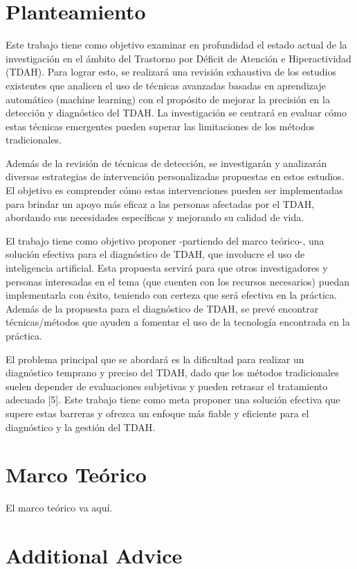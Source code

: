 \documentclass[10pt,journal,compsoc]{IEEEtran}
\begin{document}
\section{Planteamiento}
Este trabajo tiene como objetivo examinar en profundidad el estado actual de la investigación en el ámbito del Trastorno por Déficit de Atención e Hiperactividad (TDAH). Para lograr esto, se realizará una revisión exhaustiva de los estudios existentes que analicen el uso de técnicas avanzadas basadas en aprendizaje automático (machine learning) con el propósito de mejorar la precisión en la detección y diagnóstico del TDAH. La investigación se centrará en evaluar cómo estas técnicas emergentes pueden superar las limitaciones de los métodos tradicionales.

Además de la revisión de técnicas de detección, se investigarán y analizarán diversas estrategias de intervención personalizadas propuestas en estos estudios. El objetivo es comprender cómo estas intervenciones pueden ser implementadas para brindar un apoyo más eficaz a las personas afectadas por el TDAH, abordando sus necesidades específicas y mejorando su calidad de vida.

El trabajo tiene como objetivo proponer -partiendo del marco teórico-, una solución efectiva para el diagnóstico de TDAH, que involucre el uso de inteligencia artificial. Esta propuesta servirá para que otros investigadores y personas interesadas en el tema (que cuenten con los recursos necesarios) puedan implementarla con éxito, teniendo con certeza que será efectiva en la práctica. Además de la propuesta para el diagnóstico de TDAH, se prevé encontrar técnicas/métodos que ayuden a fomentar el uso de la tecnología encontrada en la práctica.

El problema principal que se abordará es la dificultad para realizar un diagnóstico temprano y preciso del TDAH, dado que los métodos tradicionales suelen depender de evaluaciones subjetivas y pueden retrasar el tratamiento adecuado [5]. Este trabajo tiene como meta proponer una solución efectiva que supere estas barreras y ofrezca un enfoque más fiable y eficiente para el diagnóstico y la gestión del TDAH.

\section{Marco Teórico}
El marco teórico va aquí.

\section{Additional Advice}
\end{document}

